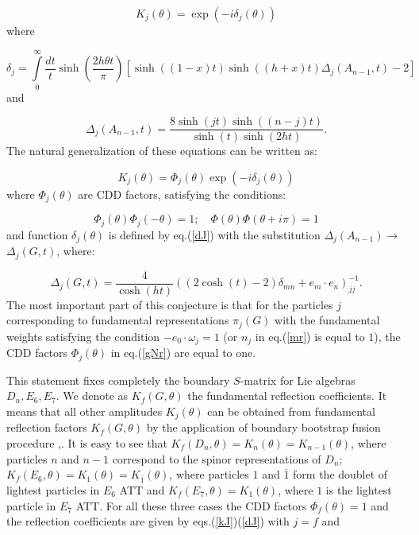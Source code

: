 \documentclass[a4paper,12pt]{article}
\begin{document}
\begin{equation}
K_j(\theta )=\exp (-i\delta _j(\theta ))  \label{kJ}
\end{equation}
where

\begin{equation}
\delta _j=\int\limits_0^\infty \frac{dt}t\sinh (\frac{2h\theta t}\pi )
[\sinh ((1-x)t)\sinh((h+x)t)
\Delta _j(A_{n-1},t)-2]  \label{dJ}
\end{equation}
and

\begin{equation}
\Delta _j(A_{n-1},t)=\frac{8\sinh \left( jt\right) \sinh ((n-j)t)}
{\sinh(t)\sinh (2ht)}.  \label{DJ}
\end{equation}
The natural generalization of these equations can be written as:

\begin{equation}
K_j(\theta )=\Phi _j(\theta )\exp (-i\delta _j(\theta ))  \label{gNr}
\end{equation}
where $\Phi _j(\theta )$ are CDD factors, satisfying the conditions:

\begin{equation}
\Phi _j(\theta )\Phi _j(-\theta )=1;\quad \Phi (\theta )
\Phi (\theta +i\pi)=1  \label{cDd}
\end{equation}
and function $\delta _j\left( \theta \right) $ 
is defined by eq.(\ref{dJ})
with the substitution 
$\Delta _j(A_{n-1})\rightarrow $ $\Delta _j(G,t)$,
where:

\begin{equation}
\Delta _j(G,t)=\frac 4{\cosh \left( ht\right) }\left( (2\cosh (t)-2)
\delta_{mn}+e_m\cdot e_n\right) _{jj}^{-1}.  \label{cOn}
\end{equation}
The most important part of this conjecture is that for the particles $j$
corresponding to fundamental representations $\pi _j(G)$ with the
fundamental weights satisfying the condition $-e_0\cdot \omega _j=1$ 
(or $ n_j $ in eq.(\ref{mr}) is equal to $1$), 
the CDD factors $\Phi _j(\theta )$
in eq.(\ref{gNr}) are equal to one.

This statement fixes completely the boundary $S$-matrix for Lie 
algebras $D_n,E_6,E_7$. We denote as $K_f(G,\theta )$ 
the fundamental reflection
coefficients. It means that all other amplitudes $K_j(\theta )$ 
can be obtained from fundamental reflection factors
$K_f(G,\theta )$ by the application 
of boundary bootstrap fusion procedure 
\cite{GZ},\cite{FK}. It is easy to see that 
$K_f(D_n,\theta )=K_n(\theta)=K_{n-1}(\theta )$, 
where particles $n$ and $n-1$ correspond to the spinor
representations of $D_n$; $K_f(E_6,\theta )=K_1\left( \theta \right) =
K_{\overline{1}}\left( \theta \right) $, 
where particles $1$ and $\overline{1}$
form the doublet of lightest particles in $E_6$ ATT and $K_f(E_7,\theta
)=K_1(\theta )$, where $1$ is the lightest particle in $E_7$ ATT. For all
these three cases the CDD factors $\Phi _f(\theta )=1$ and the reflection
coefficients are given by eqs.(\ref{kJ})(\ref{dJ}) with $j=f$ and
\end{document}
